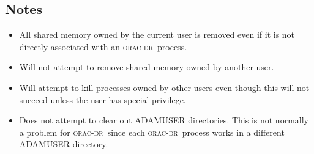 \documentclass[twoside,11pt]{article}
\renewcommand{\_}{\texttt{\symbol{95}}}
\newcommand{\oracdr}{\textsc{orac-dr}}
\begin{document}
\subsection*{Notes\label{oracdr_nuke_NOTES}}
\begin{itemize}
\item 

All shared memory owned by the current user is removed even if
it is not directly associated with an \oracdr\ process.

\item 

Will not attempt to remove shared memory owned by another user.

\item 

Will attempt to kill processes owned by other users even though
this will not succeed unless the user has special privilege.

\item 

Does not attempt to clear out ADAM\_USER directories. This is not
normally a problem for \oracdr\ since each \oracdr\ process works
in a different ADAM\_USER directory.

\end{itemize}


\end{document}
